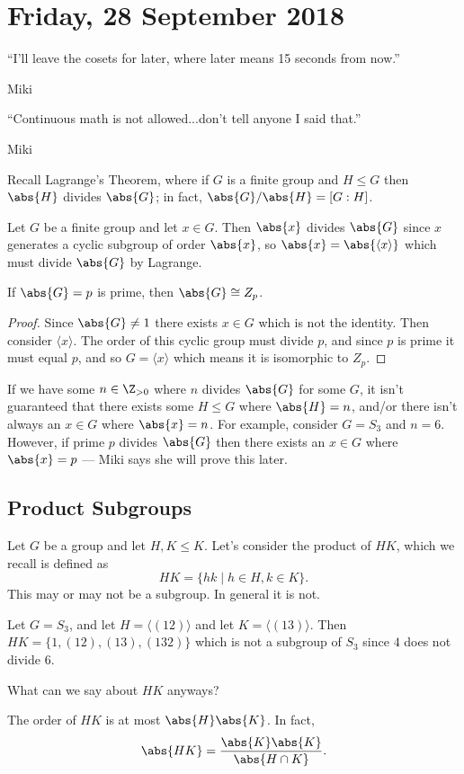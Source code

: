 \section{Friday, 28 September 2018}

\epigraph{``I'll leave the cosets for later, where later means 15 seconds from now.''}{Miki}
\epigraph{``Continuous math is not allowed...don't tell anyone I said that.''}{Miki}

Recall Lagrange's Theorem, where if $G$ is a finite group and $H \leq G$ then $\abs{H}$ divides $\abs{G}$; in fact, $\abs{G} / \abs{H} = [G : H]$.

\begin{corollary}
Let $G$ be a finite group and let $x \in G$. Then $\abs{x}$ divides $\abs{G}$ since $x$ generates a cyclic subgroup of order $\abs{x}$, so $\abs{x} = \abs{\langle x \rangle}$ which must divide $\abs{G}$ by Lagrange.
\end{corollary}

\begin{corollary}
If $\abs{G} = p$ is prime, then $\abs{G} \cong Z_p$.
\end{corollary}

\begin{proof}
Since $\abs{G} \not= 1$ there exists $x \in G$ which is not the identity. Then consider $\langle x \rangle$. The order of this cyclic group must divide $p$, and since $p$ is prime it must equal $p$, and so $G = \langle x \rangle$ which means it is isomorphic to $Z_p$.
\end{proof}

If we have some $n \in \Z_{>0}$ where $n$ divides $\abs{G}$ for some $G$, it isn't guaranteed that there exists some $H \leq G$ where $\abs{H} = n$, and/or there isn't always an $x \in G$ where $\abs{x} = n$. For example, consider $G = S_3$ and $n = 6$. However, if prime $p$ divides $\abs{G}$ then there exists an $x \in G$ where $\abs{x} = p$ --- Miki says she will prove this later.

\subsection{Product Subgroups}

Let $G$ be a group and let $H,K \leq K$. Let's consider the product of $HK$, which we recall is defined as \[ HK = \{ hk \mid h \in H, k \in K \}. \]
This may or may not be a subgroup. In general it is not.
\begin{example}
Let $G = S_3$, and let $H = \langle (12) \rangle$ and let $K = \langle (13) \rangle$. Then $HK = \{1, (12), (13), (132)\}$ which is not a subgroup of $S_3$ since $4$ does not divide $6$.
\end{example}
What can we say about $HK$ anyways?
\begin{proposition}
The order of $HK$ is at most $\abs{H}\abs{K}$. In fact, 
\[ \abs{HK} = \frac{\abs{K}\abs{K}}{\abs{H \cap K}}. \]
\end{proposition}

